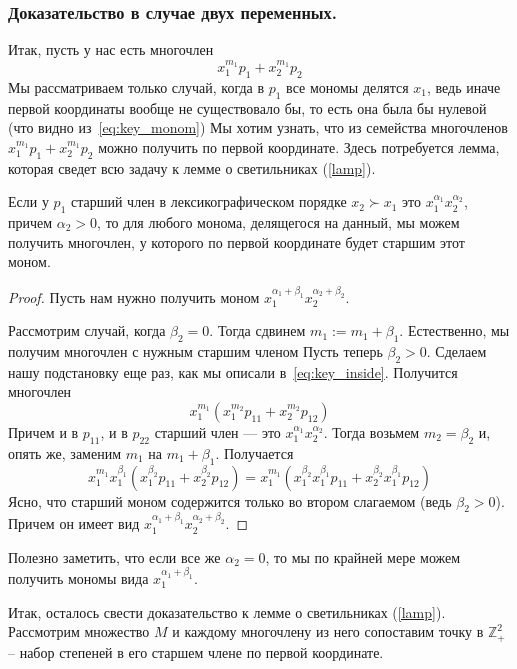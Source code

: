 \subsubsection{Доказательство в случае двух переменных.}
Итак, пусть у нас есть многочлен \[x_1^{m_1}p_1+x_2^{m_1}p_2\]
Мы рассматриваем только случай, когда в $p_1$ все мономы делятся $x_1$, ведь иначе первой координаты вообще не существовало бы, то есть она была бы нулевой (что видно из~\eqref{eq:key_monom})
Мы хотим узнать, что из семейства многочленов $x_1^{m_1}p_1+x_2^{m_1}p_2$ можно получить по первой координате.
Здесь потребуется лемма, которая сведет всю задачу к лемме о светильниках (\ref{lamp}).\vskip 0.1in\noindent
\begin{lemma}
    Если у $p_1$ старший член в лексикографическом порядке $x_2\succ x_1$ это $x_1^{\alpha_1}x_2^{\alpha_2}$, причем $\alpha_2>0$, то для любого монома, делящегося на данный, мы можем получить многочлен, у которого по первой координате будет старшим этот моном.
\end{lemma}
\begin{proof}
    Пусть нам нужно получить моном $x_1^{\alpha_1+\beta_1}x_2^{\alpha_2+\beta_2}$.

    Рассмотрим случай, когда $\beta_2=0$.
    Тогда сдвинем %
    $m_1 := m_1+\beta_1$.
    Естественно, мы получим многочлен с нужным старшим членом
    Пусть теперь $\beta_2>0$.
    Сделаем нашу подстановку еще раз, как мы описали в~\eqref{eq:key_inside}.
    Получится многочлен
    \[x_1^{m_1}(x_1^{m_2} p_{11}+x_2^{m_2} p_{12})\]Причем и в $p_{11}$, и в $p_{22}$ старший член --- это $x_1^{\alpha_1}x_2^{\alpha_2}$.
    Тогда возьмем $m_2=\beta_2$ и, опять же, заменим $m_1$ на $m_1+ \beta_1$.
    Получается
    \[x_1^{m_1}x_1^{\beta_1}(x_1^{\beta_2} p_{11}+x_2^{\beta_2} p_{12})=x_1^{m_1}(x_1^{\beta_2}x_1^{\beta_1}p_{11}+x_2^{\beta_2}x_1^{\beta_1} p_{12})\]Ясно, что старший моном содержится только во втором слагаемом (ведь $\beta_2>0$). Причем он имеет вид $x_1^{\alpha_1+\beta_1}x_2^{\alpha_2+\beta_2}$.
\end{proof}
\begin{remark}
    \label{remark}
    Полезно заметить, что если все же $\alpha_2=0$, то мы по крайней мере можем получить мономы вида $x_1^{\alpha_1 + \beta_1}$.
\end{remark}
\vskip 0.1in\noindent
Итак, осталось свести доказательство к лемме о светильниках (\ref{lamp}). Рассмотрим множество $M$ и каждому многочлену из него сопоставим точку в $\mathbb{Z}_+^2$ -- набор степеней в его старшем члене по первой координате.

